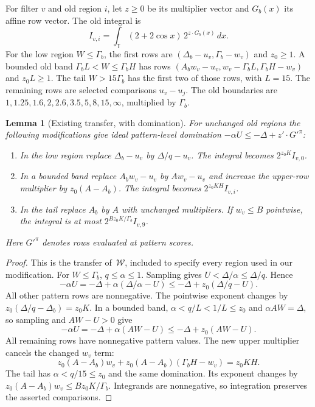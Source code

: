\documentclass[11pt]{article}
\newtheorem{lemma}[theorem]{Lemma}
\theoremstyle{remark}\newtheorem*{remark}{Scope}
\newcommand{\T}{\mathbb T}
\begin{document}
For filter $v$ and old region $i$, let $z\ge0$ be its multiplier vector
and $G_b(x)$ its affine row vector. The old integral is
\begin{equation}\label{eq:integral}
 I_{v,i}=\int_{\T}(2+2\cos x)\,2^{z\cdot G_b(x)}\,dx.
\end{equation}
For the low region $W\le\Gamma_b$, the first rows are
$(\Delta_b-u_v,\Gamma_b-w_v)$ and $z_0\ge1$.
A bounded old band $\Gamma_b L<W\le\Gamma_b H$ has rows
$(A_bw_v-u_v,w_v-\Gamma_bL,\Gamma_bH-w_v)$ and $z_0L\ge1$.
The tail $W>15\Gamma_b$ has the first two of those rows, with $L=15$.
The remaining rows are selected comparisons $u_v-u_j$.
The old boundaries are
$1,1.25,1.6,2,2.6,3.5,5,8,15,\infty$, multiplied by $\Gamma_b$.

\begin{lemma}[Existing transfer, with domination]\label{lem:old}
For unchanged old regions the following modifications give ideal pattern-level
domination $-\alpha U\le-\Delta+z'\cdot G'^\pi$:
\begin{enumerate}
\item In the low region replace $\Delta_b-u_v$ by $\Delta/q-u_v$.
The integral becomes $2^{z_0K}I_{v,0}$.
\item In a bounded band replace $A_bw_v-u_v$ by $Aw_v-u_v$ and
increase the upper-row multiplier by $z_0(A-A_b)$. The integral becomes
$2^{z_0KH}I_{v,i}$.
\item In the tail replace $A_b$ by $A$ with unchanged multipliers.
If $w_v\le B$ pointwise, the integral is at most
$2^{Bz_0K/\Gamma_b}I_{v,9}$.
\end{enumerate}
Here $G'^\pi$ denotes rows evaluated at pattern scores.
\end{lemma}
\begin{proof}
This is the transfer of~$\mathcal W$, included to specify every region
used in our modification. For $W\le\Gamma_b$, $q\le\alpha\le1$.
Sampling gives $U<\Delta/\alpha\le\Delta/q$. Hence
\[
 -\alpha U=-\Delta+\alpha(\Delta/\alpha-U)
 \le-\Delta+z_0(\Delta/q-U).
\]
All other pattern rows are nonnegative. The pointwise exponent changes
by $z_0(\Delta/q-\Delta_b)=z_0K$.
In a bounded band, $\alpha<q/L<1/L\le z_0$ and $\alpha AW=\Delta$,
so sampling and $AW-U>0$ give
\[
 -\alpha U=-\Delta+\alpha(AW-U)\le-\Delta+z_0(AW-U).
\]
All remaining rows have nonnegative pattern values. The new upper
multiplier cancels the changed $w_v$ term:
\[
 z_0(A-A_b)w_v+z_0(A-A_b)(\Gamma_bH-w_v)=z_0KH.
\]
The tail has $\alpha<q/15\le z_0$ and the same domination. Its exponent
changes by $z_0(A-A_b)w_v\le Bz_0K/\Gamma_b$. Integrands are nonnegative,
so integration preserves the asserted comparisons.
\end{proof}
\end{document}

